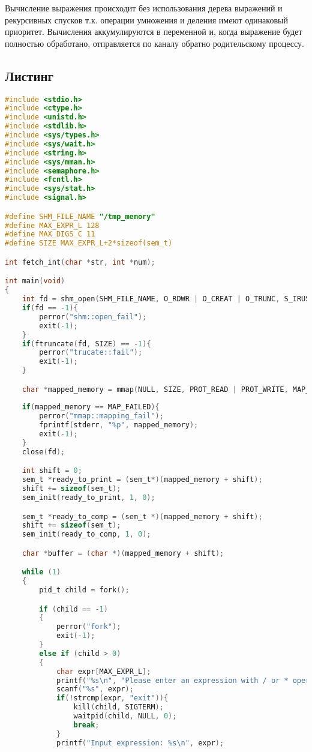 \documentclass[12pt]{article}
\begin{document}
Вычисление выражения происходит без использования дерева выражений и рекурсивных спусков т.к. операции умножения и деления имеют одинаковый приоритет. Вычисления аккумулируются в переменной и, когда выражение будет полностью обработано, отправляется по каналу обратно родительскому процессу.

\subsection*{Листинг}

\begin{lstlisting}[language=C, basicstyle=\scriptsize]
#include <stdio.h>
#include <ctype.h>
#include <unistd.h>
#include <stdlib.h>
#include <sys/types.h>
#include <sys/wait.h>
#include <string.h>
#include <sys/mman.h>
#include <semaphore.h>
#include <fcntl.h>
#include <sys/stat.h>
#include <signal.h>

#define SHM_FILE_NAME "/tmp_memory"
#define MAX_EXPR_L 128
#define MAX_DIGS_C 11
#define SIZE MAX_EXPR_L+2*sizeof(sem_t)

int fetch_int(char *str, int *num);

int main(void)
{
	int fd = shm_open(SHM_FILE_NAME, O_RDWR | O_CREAT | O_TRUNC, S_IRUSR | S_IWUSR);
	if(fd == -1){
		perror("shm::open_fail");
		exit(-1);
	}
	if(ftruncate(fd, SIZE) == -1){
		perror("trucate::fail");
		exit(-1);
	}

	char *mapped_memory = mmap(NULL, SIZE, PROT_READ | PROT_WRITE, MAP_SHARED, fd, 0);
	
	if(mapped_memory == MAP_FAILED){
		perror("mmap::mapping_fail");
		fprintf(stderr, "%p", mapped_memory);
		exit(-1);
	}
	close(fd);

	int shift = 0;
	sem_t *ready_to_print = (sem_t*)(mapped_memory + shift);
	shift += sizeof(sem_t);
	sem_init(ready_to_print, 1, 0);

	sem_t *ready_to_comp = (sem_t *)(mapped_memory + shift);
	shift += sizeof(sem_t);
	sem_init(ready_to_comp, 1, 0);

	char *buffer = (char *)(mapped_memory + shift);

	while (1)
	{
		pid_t child = fork();

		if (child == -1)
		{
			perror("fork");
			exit(-1);
		}
		else if (child > 0)
		{
			char expr[MAX_EXPR_L];
			printf("%s\n", "Please enter an expression with / or * operations only");
			scanf("%s", expr);
			if(!strcmp(expr, "exit")){
				kill(child, SIGTERM);
				waitpid(child, NULL, 0);
				break;
			}
			printf("Input expression: %s\n", expr);


\end{lstlisting}
\end{document}
